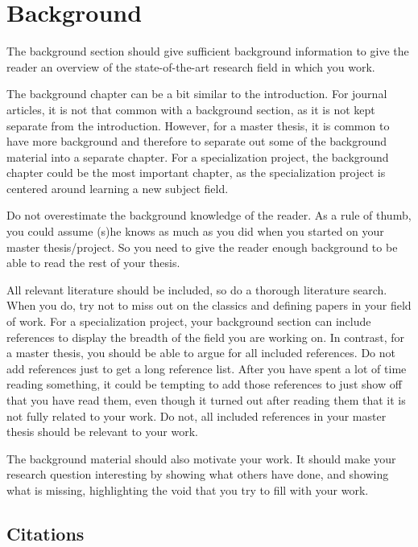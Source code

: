 \chapter{Background}
\label{chap:Background}

The background section should give sufficient background information to give the reader an overview of the state-of-the-art research field in which you work.

The background chapter can be a bit similar to the introduction. For journal articles, it is not that common with a background section, as it is not kept separate from the introduction. However, for a master thesis, it is common to have more background and therefore to separate out some of the background material into a separate chapter. For a specialization project, the background chapter could be the most important chapter, as the specialization project is centered around learning a new subject field.

Do not overestimate the background knowledge of the reader. As a rule of thumb, you could assume (s)he knows as much as you did when you started on your master thesis/project. So you need to give the reader enough background to be able to read the rest of your thesis.

All relevant literature should be included, so do a thorough literature search. When you do, try not to miss out on the classics and defining papers in your field of work. For a specialization project, your background section can include references to display the breadth of the field you are working on. In contrast, for a master thesis, you should be able to argue for all included references. Do not add references just to get a long reference list. After you have spent a lot of time reading something, it could be tempting to add those references to just show off that you have read them, even though it turned out after reading them that it is not fully related to your work. Do not, all included references in your master thesis should be relevant to your work.

The background material should also motivate your work. It should make your research question interesting by showing what others have done, and showing what is missing, highlighting the void that you try to fill with your work.


\section{Citations}

